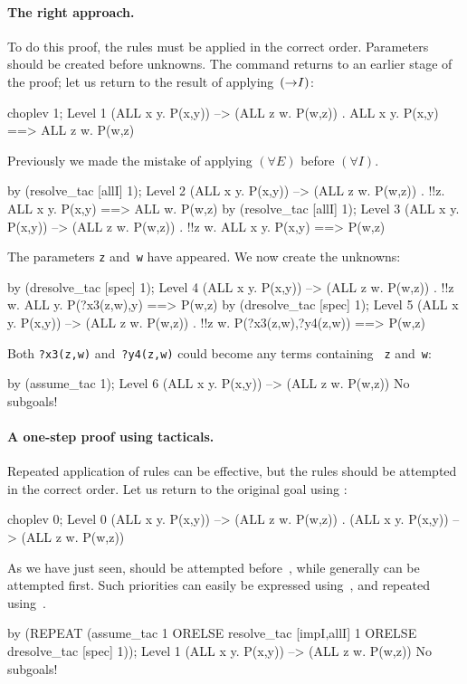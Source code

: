 \paragraph{The right approach.}
To do this proof, the rules must be applied in the correct order.
Parameters should be created before unknowns.  The
 command returns to an earlier stage of the proof;
let us return to the result of applying~$({\rightarrow}I)$:
\begin{ttbox}
choplev 1;
{\out Level 1}
{\out (ALL x y. P(x,y)) --> (ALL z w. P(w,z))}
{. ALL x y. P(x,y) ==> ALL z w. P(w,z)}
\end{ttbox}
Previously we made the mistake of applying $(\forall E)$ before $(\forall I)$.
\begin{ttbox}
by (resolve_tac [allI] 1);
{\out Level 2}
{\out (ALL x y. P(x,y)) --> (ALL z w. P(w,z))}
{. !!z. ALL x y. P(x,y) ==> ALL w. P(w,z)}
\ttbreak
by (resolve_tac [allI] 1);
{\out Level 3}
{\out (ALL x y. P(x,y)) --> (ALL z w. P(w,z))}
{. !!z w. ALL x y. P(x,y) ==> P(w,z)}
\end{ttbox}
The parameters {\tt z} and~{\tt w} have appeared.  We now create the
unknowns:
\begin{ttbox}
by (dresolve_tac [spec] 1);
{\out Level 4}
{\out (ALL x y. P(x,y)) --> (ALL z w. P(w,z))}
{. !!z w. ALL y. P(?x3(z,w),y) ==> P(w,z)}
\ttbreak
by (dresolve_tac [spec] 1);
{\out Level 5}
{\out (ALL x y. P(x,y)) --> (ALL z w. P(w,z))}
{. !!z w. P(?x3(z,w),?y4(z,w)) ==> P(w,z)}
\end{ttbox}
Both {\tt?x3(z,w)} and~{\tt?y4(z,w)} could become any terms containing {\tt
z} and~{\tt w}:
\begin{ttbox}
by (assume_tac 1);
{\out Level 6}
{\out (ALL x y. P(x,y)) --> (ALL z w. P(w,z))}
{\out No subgoals!}
\end{ttbox}

\paragraph{A one-step proof using tacticals.}
  

Repeated application of rules can be effective, but the rules should be
attempted in the correct order.  Let us return to the original goal using
:
\begin{ttbox}
choplev 0;
{\out Level 0}
{\out (ALL x y. P(x,y)) --> (ALL z w. P(w,z))}
{. (ALL x y. P(x,y)) --> (ALL z w. P(w,z))}
\end{ttbox}
As we have just seen,  should be attempted
before~, while  generally can be
attempted first.  Such priorities can easily be expressed
using~, and repeated using~.
\begin{ttbox}
by (REPEAT (assume_tac 1 ORELSE resolve_tac [impI,allI] 1
     ORELSE dresolve_tac [spec] 1));
{\out Level 1}
{\out (ALL x y. P(x,y)) --> (ALL z w. P(w,z))}
{\out No subgoals!}
\end{ttbox}


